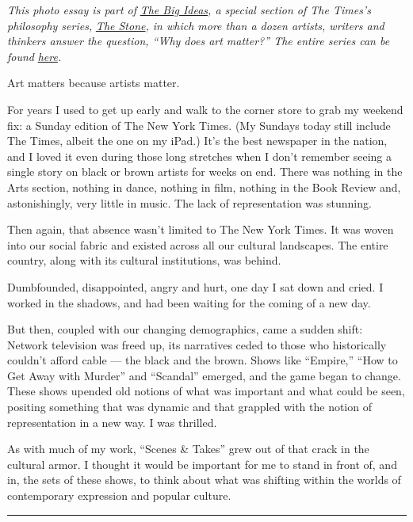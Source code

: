 \emph{This photo essay is part of}
\href{https://www.nytimes3xbfgragh.onion/spotlight/the-big-ideas}{\emph{The
Big Ideas}}\emph{, a special section of The Times's philosophy series,}
\href{https://www.nytimes3xbfgragh.onion/column/the-stone?action=click\&module=RelatedLinks\&pgtype=Article}{\emph{The
Stone}}\emph{, in which more than a dozen artists, writers and thinkers
answer the question, ``Why does art matter?'' The entire series can be
found}
\href{https://www.nytimes3xbfgragh.onion/spotlight/the-big-ideas}{\emph{here}}\emph{.}

Art matters because artists matter.

For years I used to get up early and walk to the corner store to grab my
weekend fix: a Sunday edition of The New York Times. (My Sundays today
still include The Times, albeit the one on my iPad.) It's the best
newspaper in the nation, and I loved it even during those long stretches
when I don't remember seeing a single story on black or brown artists
for weeks on end. There was nothing in the Arts section, nothing in
dance, nothing in film, nothing in the Book Review and, astonishingly,
very little in music. The lack of representation was stunning.

Then again, that absence wasn't limited to The New York Times. It was
woven into our social fabric and existed across all our cultural
landscapes. The entire country, along with its cultural institutions,
was behind.

Dumbfounded, disappointed, angry and hurt, one day I sat down and cried.
I worked in the shadows, and had been waiting for the coming of a new
day.

But then, coupled with our changing demographics, came a sudden shift:
Network television was freed up, its narratives ceded to those who
historically couldn't afford cable --- the black and the brown. Shows
like ``Empire,'' ``How to Get Away with Murder'' and ``Scandal''
emerged, and the game began to change. These shows upended old notions
of what was important and what could be seen, positing something that
was dynamic and that grappled with the notion of representation in a new
way. I was thrilled.

As with much of my work, ``Scenes \& Takes'' grew out of that crack in
the cultural armor. I thought it would be important for me to stand in
front of, and in, the sets of these shows, to think about what was
shifting within the worlds of contemporary expression and popular
culture.

\begin{center}\rule{0.5\linewidth}{\linethickness}\end{center}

